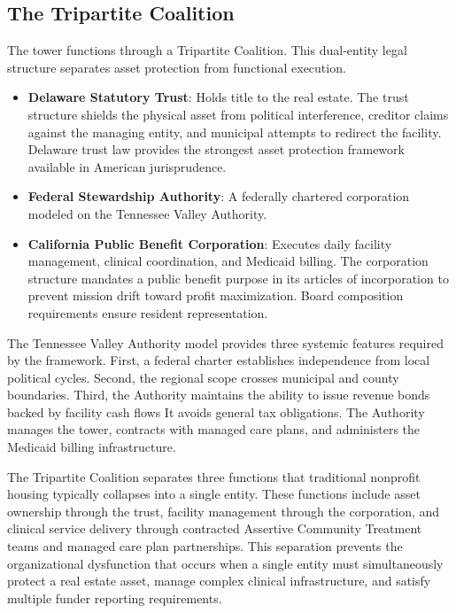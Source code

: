 \documentclass[12pt, letterpaper]{article}
\begin{document}
\subsection{The Tripartite Coalition}

The tower functions through a Tripartite Coalition. This dual-entity legal structure separates asset protection from functional execution.

\begin{itemize}
    \item \textbf{Delaware Statutory Trust}: Holds title to the real estate. The trust structure shields the physical asset from political interference, creditor claims against the managing entity, and municipal attempts to redirect the facility. Delaware trust law provides the strongest asset protection framework available in American jurisprudence.
    \item \textbf{Federal Stewardship Authority}: A federally chartered corporation modeled on the Tennessee Valley Authority.
    \item \textbf{California Public Benefit Corporation}: Executes daily facility management, clinical coordination, and Medicaid billing. The corporation structure mandates a public benefit purpose in its articles of incorporation to prevent mission drift toward profit maximization. Board composition requirements ensure resident representation.
\end{itemize}

The Tennessee Valley Authority model provides three systemic features required by the framework. First, a federal charter establishes independence from local political cycles. Second, the regional scope crosses municipal and county boundaries. Third, the Authority maintains the ability to issue revenue bonds backed by facility cash flows It avoids general tax obligations. The Authority manages the tower, contracts with managed care plans, and administers the Medicaid billing infrastructure.

The Tripartite Coalition separates three functions that traditional nonprofit housing typically collapses into a single entity. These functions include asset ownership through the trust, facility management through the corporation, and clinical service delivery through contracted Assertive Community Treatment teams and managed care plan partnerships. This separation prevents the organizational dysfunction that occurs when a single entity must simultaneously protect a real estate asset, manage complex clinical infrastructure, and satisfy multiple funder reporting requirements.
\end{document}
